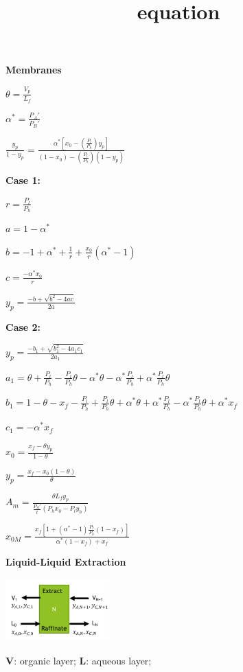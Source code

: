 \documentclass[12pt]{article}
\title{equation}
\begin{document}
\noindent

\begin{multicols}{2}
\textbf{Membranes}

$\theta=\frac{V_p}{L_f}$

$\alpha^*=\frac{P_A'}{P_B'}$ 

$\frac{y_p}{1-y_p}=\frac{\alpha^*\left[x_0-\left(\frac{P_l}{P_h}\right)y_p\right]}{\left(1-x_0\right)-\left(\frac{P_l}{P_h}\right)\left(1-y_p\right)}$ 

\textbf{Case 1:} 

$r=\frac{P_l}{P_h}$ 

$a=1-\alpha^*$ 

$b=-1+\alpha^*+\frac{1}{r}+\frac{x_0}{r}\left(\alpha^*-1\right)$ 

$c=\frac{-\alpha^*x_0}{r}$ 

$y_p=\frac{-b+\sqrt{b^2-4ac}}{2a}$ 

\textbf{Case 2:} 

$y_p=\frac{-b_1+\sqrt{b_1^2-4a_1c_1}}{2a_1}$ 

$a_1 = \theta + \frac{P_l}{P_h} - \frac{P_l}{P_h}\theta - \alpha^*\theta - \alpha^*\frac{P_l}{P_h} + \alpha^*\frac{P_l}{P_h}\theta$ 

$b_1 = 1 - \theta - x_f - \frac{P_l}{P_h} + \frac{P_l}{P_h}\theta + \alpha^*\theta + \alpha^*\frac{P_l}{P_h} - \alpha^*\frac{P_l}{P_h}\theta + \alpha^* x_f$ 

$c_1 = -\alpha^* x_f$ 

$x_0=\frac{x_f-\theta y_p}{1-\theta}$ 

$y_p=\frac{x_f-x_0\left(1-\theta\right)}{\theta}$ 

$A_m = \frac{\theta L_f y_p}{\frac{P_A'}{t}\left(P_h x_0 - P_l y_h\right)}$ 

$x_{0M} = \frac{x_f \left[1 + \left(\alpha^*-1\right)\frac{P_l}{P_h}\left(1-x_f\right)\right]}{\alpha^*\left(1-x_f\right)+x_f}$ 

\textbf{Liquid-Liquid Extraction}

\begin{center}
    \includegraphics[width=0.3\textwidth]{ll_diag.png}
\end{center}

\textbf{V}: organic layer; \textbf{L}: aqueous layer;


\end{multicols}
\end{document}
